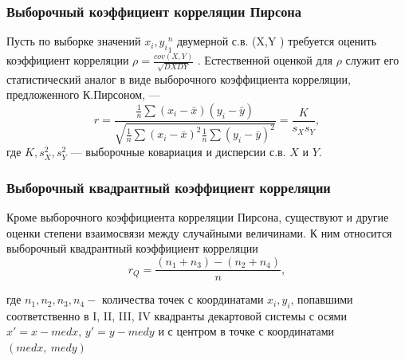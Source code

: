 \documentclass[a4paper]{article}
\begin{document}
\subsubsection{Выборочный коэффициент корреляции Пирсона}
\noindent Пусть по выборке значений ${x_{i},y_{i}}^{n}_{1}$ двумерной с.в. (X,Y ) требуется оценить коэффициент корреляции $\rho = \frac{cov(X,Y)}{\sqrt{DXDY}}$ . Естественной оценкой для $\rho$ служит его статистический аналог в виде выборочного коэффициента корреляции, предложенного К.Пирсоном, —
\begin{equation}
r = \frac{
	\frac{1}{n}\sum{(x_{i} - \bar{x})(y_{i}-\bar{y})}
}{
	\sqrt{\frac{1}{n}\sum{(x_{i} - \bar{x})^{2}}\frac{1}{n}\sum{(y_{i} - \bar{y})^{2}}}
}=\frac{K}{s_{X}s_{Y}},
\label{r}
\end{equation}
где $K,s^{2}_{X},s^{2}_{Y}$ — выборочные ковариация и дисперсии с.в. $X$ и $Y$.


\subsubsection{Выборочный квадрантный коэффициент корреляции}
\noindent Кроме выборочного коэффициента корреляции Пирсона, существуют и другие оценки степени взаимосвязи между случайными величинами. К ним относится выборочный квадрантный коэффициент корреляции
\begin{equation}
r_{Q} = \frac{(n_{1} + n_{3}) - (n_{2} + n_{4})}{n},
\label{rQ}
\end{equation}

\noindent где $n_1, n_2, n_3, n_4 - $ количества точек с координатами $x_i, y_i$, попавшими соответственно в I, II, III, IV квадранты декартовой системы с осями $x'=x-med x$, $y'=y-med y$ и с центром в точке с координатами $(med x,~med y)$
\end{document}
